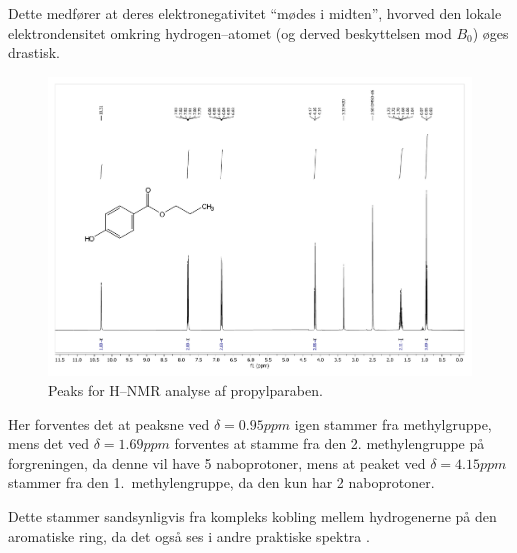     Dette medfører at deres elektronegativitet ``mødes i midten'', hvorved den lokale elektrondensitet omkring hydrogen--atomet (og derved beskyttelsen mod $B_0$) øges drastisk.
    \begin{figure}[H] \centering
        \includegraphics[width=\textwidth,page=2]{bilag/propylnmr}
        \caption{Peaks for H--NMR analyse af propylparaben.}
    \end{figure}
    Her forventes det at peaksne ved $\delta=0.95\si{ppm}$ igen stammer fra methylgruppe, mens det ved $\delta=1.69\si{ppm}$ forventes at stamme fra den 2. methylengruppe på forgreningen, da denne vil have 5 naboprotoner, mens at peaket ved $\delta=4.15\si{ppm}$ stammer fra den 1.\ methylengruppe, da den kun har 2 naboprotoner. 

    Dette stammer sandsynligvis fra kompleks kobling mellem hydrogenerne på den aromatiske ring, da det også ses i andre praktiske spektra \parencite{SDBS}.

